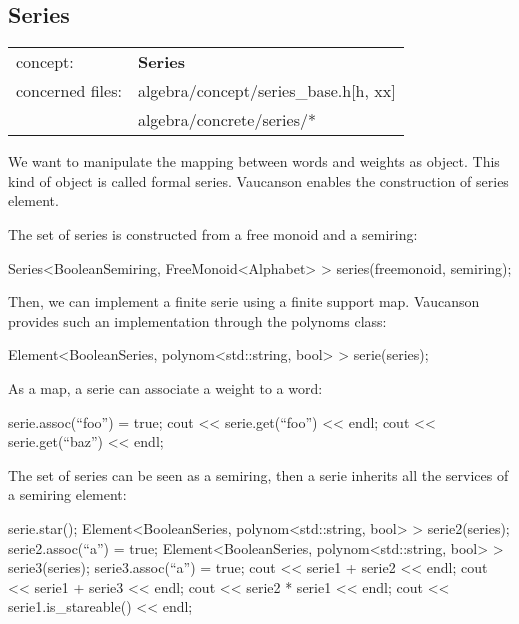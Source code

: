 \documentclass{article}
\begin{document}
\subsection{Series}

\begin{tabular}%
{ll}
\hline 
concept: & \textbf{Series}  \\
concerned files: & algebra/concept/series\_base.h[h, xx] \\
                 & algebra/concrete/series/* \\
\hline 
\end{tabular}

We want to manipulate the mapping between words and weights as object.
This kind of object is called formal series. Vaucanson enables the
construction of series element. 

The set of series is constructed from a free monoid and a semiring:

\begin{code}
Series<BooleanSemiring, FreeMonoid<Alphabet> > series(freemonoid, semiring); 
\end{code}

Then, we can implement a finite serie using a finite support map.
Vaucanson provides such an implementation through the polynoms class:

\begin{code}[A serie]
Element<BooleanSeries, polynom<std::string, bool> > serie(series);
\end{code}

As a map, a serie can associate a weight to a word:

\begin{code}
serie.assoc(``foo'') = true;
cout << serie.get(``foo'') << endl;
cout << serie.get(``baz'') << endl;
\end{code}

The set of series can be seen as a semiring, then a serie inherits all
the services of a semiring element:

\begin{code}
serie.star();
Element<BooleanSeries, polynom<std::string, bool> > serie2(series);
serie2.assoc(``a'') = true;
Element<BooleanSeries, polynom<std::string, bool> > serie3(series);
serie3.assoc(``a'') = true;
cout << serie1 + serie2 << endl;
cout << serie1 + serie3 << endl;
cout << serie2 * serie1 << endl;
cout << serie1.is_stareable() << endl;
\end{code}
\end{document}
